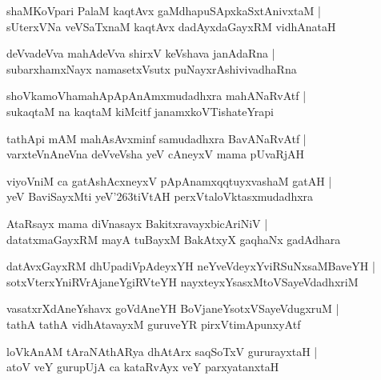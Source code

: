 \documentclass[twoside,12pt,openright]{book}
\def\S{\char'263}
\newcounter{shloka}[chapter]
\begin{document}
\begin{shloka}%
shaMKoVpari PalaM kaqtAvx gaMdhapuSApxkaSxtAnivxtaM |\\
sUterxVNa veVSaTxnaM kaqtAvx dadAyxdaGayxRM vidhAnataH 
\end{shloka}

\begin{shloka}%
deVvadeVva mahAdeVva shirxV keVshava janAdaRna |\\
subarxhamxNayx namasetxVsutx puNayxrAshivivadhaRna 
\end{shloka}

\begin{shloka}%
shoVkamoVhamahApApAnAmxmudadhxra mahANaRvAtf |\\
sukaqtaM na kaqtaM kiMcitf janamxkoVTishateYrapi
\end{shloka}

\begin{shloka}%
tathApi mAM mahAsAvxminf samudadhxra BavANaRvAtf |\\
varxteVnAneVna deVveVsha yeV cAneyxV mama pUvaRjAH 
\end{shloka}

\begin{shloka}%
viyoVniM ca gatAshAcxneyxV pApAnamxqqtuyxvashaM gatAH |\\
yeV BaviSayxMti yeV\S tiVtAH perxVtaloVktasxmudadhxra
\end{shloka}

\begin{shloka}%
AtaRsayx mama diVnasayx BakitxravayxbicAriNiV |\\
datatxmaGayxRM mayA tuBayxM BakAtxyX gaqhaNx gadAdhara
\end{shloka}

\begin{shloka}%
datAvxGayxRM dhUpadiVpAdeyxYH neYveVdeyxYviRSuNxsaMBaveYH |\\
sotxVterxYniRVrAjaneYgiRVteYH nayxteyxYsasxMtoVSayeVdadhxriM
\end{shloka}

\begin{shloka}%
vasatxrXdAneYshavx goVdAneYH BoVjaneYsotxVSayeVdugxruM |\\
tathA tathA vidhAtavayxM guruveYR pirxVtimApunxyAtf
\end{shloka}

\begin{shloka}%
loVkAnAM tAraNAthARya dhAtArx saqSoTxV gururayxtaH |\\
atoV veY gurupUjA ca kataRvAyx veY parxyatanxtaH
\end{shloka}
\end{document}
